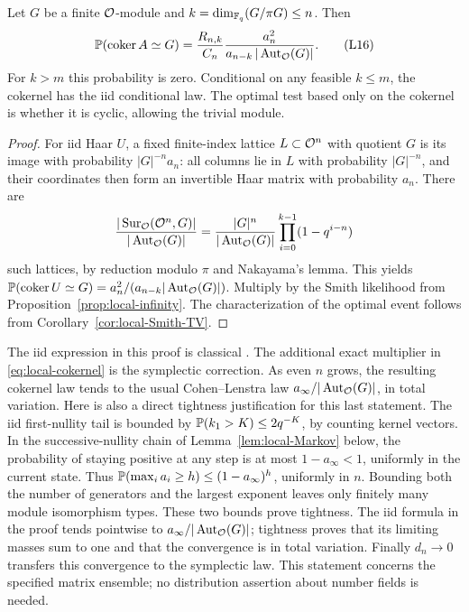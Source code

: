 \begin{corollary}\label{cor:local-cokernel}
Let \(G\) be a finite \(\mathcal O\)-module and
\(k=\dim_{\mathbb F_q}(G/\pi G)\le n\). Then
\[
 \mathbb P(\operatorname{coker} A\simeq G)
   =\frac{R_{n,k}}{C_n}
      \frac{a_n^2}{a_{n-k}\,|\operatorname{Aut}_{\mathcal O}(G)|}.
 \tag{L16}\label{eq:local-cokernel}
\]
For \(k>m\) this probability is zero.
Conditional on any feasible \(k\le m\), the cokernel has the iid
conditional law. The optimal test based only on the cokernel is
whether it is cyclic, allowing the trivial module.
\end{corollary}

\begin{proof}
For iid Haar \(U\), a fixed finite-index lattice \(L\subset\mathcal O^n\)
with quotient \(G\) is its image with probability
\(|G|^{-n}a_n\): all columns lie in \(L\) with probability
\(|G|^{-n}\), and their coordinates then form an invertible Haar
matrix with probability \(a_n\).
There are
\[
 \frac{|\operatorname{Sur}_{\mathcal O}(\mathcal O^n,G)|}{|\operatorname{Aut}_{\mathcal O}(G)|}
 =\frac{|G|^n}{|\operatorname{Aut}_{\mathcal O}(G)|}
     \prod_{i=0}^{k-1}(1-q^{i-n})
\]
such lattices, by reduction modulo \(\pi\) and Nakayama's lemma.
This yields
\(\mathbb P(\operatorname{coker} U\simeq G)=a_n^2/(a_{n-k}|\operatorname{Aut}_{\mathcal O}(G)|)\).
Multiply by the Smith likelihood from
Proposition~\ref{prop:local-infinity}.
The characterization of the optimal event follows from
Corollary~\ref{cor:local-Smith-TV}.
\end{proof}

The iid expression in this proof is classical
\cite{WangStanley}. The additional exact multiplier in
\eqref{eq:local-cokernel} is the symplectic correction.
As even \(n\) grows, the resulting cokernel law tends to the usual
Cohen--Lenstra law \(a_\infty/|\operatorname{Aut}_{\mathcal O}(G)|\), in total variation.
Here is also a direct tightness justification for this last statement.
The iid first-nullity tail is bounded by
\(\mathbb P(k_1>K)\le2q^{-K}\), by counting kernel vectors.
In the successive-nullity chain of Lemma~\ref{lem:local-Markov} below,
the probability of staying positive at any step is at most
\(1-a_\infty<1\), uniformly in the current state. Thus
\(\mathbb P(\max_i a_i\ge h)\le(1-a_\infty)^h\), uniformly in \(n\).
Bounding both the number of generators and the largest exponent leaves
only finitely many module isomorphism types. These two bounds prove
tightness. The iid formula in the proof tends pointwise to
\(a_\infty/|\operatorname{Aut}_{\mathcal O}(G)|\); tightness proves that its limiting masses
sum to one and that the convergence is in total variation.
Finally \(d_n\to0\) transfers this convergence to the symplectic law.
This statement concerns the specified matrix ensemble; no
distribution assertion about number fields is needed.

